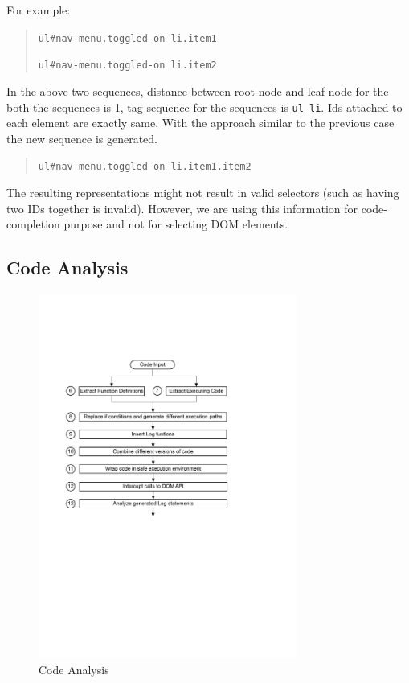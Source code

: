 \begin{description}
			For example:
			\begin{quote}
				\texttt{ul\#nav-menu.toggled-on li.item1}
	
				\texttt{ul\#nav-menu.toggled-on li.item2}
			\end{quote}

			In the above two sequences, distance between root node and leaf node for the both the sequences is 1, tag sequence for the sequences is \texttt{ul li}. Ids attached to each element are exactly same. With the approach similar to the previous case the new sequence is generated.

			\begin{quote}
				\texttt{ul\#nav-menu.toggled-on li.item1.item2}
			\end{quote}
			
			The resulting \css representations might not result in valid \css selectors (such as having two IDs together is invalid). However, we are using this information for code-completion purpose and not for selecting DOM elements.
		
		\end{description}
	
	\subsection{Code Analysis}
	\label{Sec:Code-Analysis}
		\begin{figure}
			\centering
			\includegraphics[width=85mm]{images/code_analysis.pdf}
			\caption{Code Analysis}
			\label{Fig:Code-Analysis}
		\end{figure}
		
